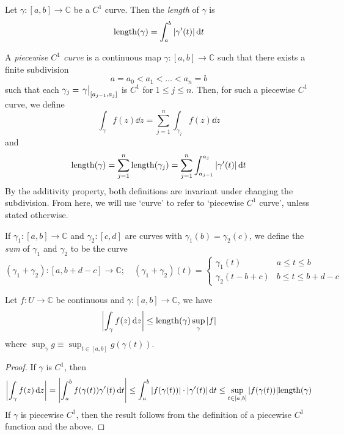 \begin{definition}
	Let \( \gamma \colon [a,b] \to \mathbb C \) be a \( C^1 \) curve.
	Then the \textit{length} of \( \gamma \) is
	\[
		\mathrm{length}(\gamma) = \int_a^b \abs{\gamma'(t)} \dd{t}
	\]
\end{definition}
\begin{definition}
	A \textit{piecewise \( C^1 \) curve} is a continuous map \( \gamma \colon [a,b] \to \mathbb C \) such that there exists a finite subdivision
	\[
		a = a_0 < a_1 < \dots < a_n = b
	\]
	such that each \( \gamma_j = \eval{\gamma}_{[a_{j-1}, a_j]} \) is \( C^1 \) for \( 1 \leq j \leq n \).
	Then, for such a piecewise \( C^1 \) curve, we define
	\[
		\int_\gamma f(z) \dd{z} = \sum_{j=1}^n \int_{\gamma_j} f(z) \dd{z}
	\]
	and
	\[
		\mathrm{length}(\gamma) = \sum_{j=1}^n \mathrm{length}(\gamma_j) = \sum_{j=1}^n \int_{a_{j-1}}^{a_j} \abs{\gamma'(t)} \dd{t}
	\]
	By the additivity property, both definitions are invariant under changing the subdivision.
	From here, we will use `curve' to refer to `piecewise \( C^1 \) curve', unless stated otherwise.
\end{definition}
\begin{definition}
	If \( \gamma_1 \colon [a,b] \to \mathbb C \) and \( \gamma_2 \colon [c,d] \) are curves with \( \gamma_1(b) = \gamma_2(c) \), we define the \textit{sum} of \( \gamma_1 \) and \( \gamma_2 \) to be the curve
	\[
		(\gamma_1 + \gamma_2) \colon [a,b+d-c] \to \mathbb C;\quad (\gamma_1 + \gamma_2)(t) = \begin{cases}
			\gamma_1(t)         & a \leq t \leq b         \\
			\gamma_2(t - b + c) & b \leq t \leq b + d - c
		\end{cases}
	\]
\end{definition}
\begin{proposition}
	Let \( f \colon U \to \mathbb C \) be continuous and \( \gamma \colon [a,b] \to \mathbb C \), we have
	\[
		\abs{\int_\gamma f(z) \dd{z}} \leq \mathrm{length}(\gamma) \sup_\gamma \abs{f}
	\]
	where \( \sup_\gamma g \equiv \sup_{t \in [a,b]} g(\gamma(t)) \).
\end{proposition}
\begin{proof}
	If \( \gamma \) is \( C^1 \), then
	\[
		\abs{\int_\gamma f(z) \dd{z}} = \abs{\int_a^b f(\gamma(t)) \gamma'(t) \dd{t}} \leq \int_a^b \abs{f(\gamma(t))} \cdot \abs{\gamma'(t)} \dd{t} \leq \sup_{t \in [a,b]} \abs{f(\gamma(t))} \mathrm{length}(\gamma)
	\]
	If \( \gamma \) is piecewise \( C^1 \), then the result follows from the definition of a piecewise \( C^1 \) function and the above.
\end{proof}

